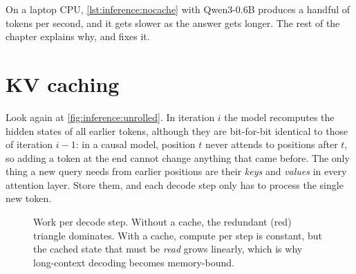 On a laptop CPU, \cref{lst:inference:nocache} with Qwen3-0.6B produces a handful of tokens per second,
and it gets slower as the answer gets longer. The rest of the chapter explains why, and fixes it.

\section{KV caching}\label{sec:inference:kvcache}

Look again at \cref{fig:inference:unrolled}. In iteration $i$ the model recomputes the hidden
states of all earlier tokens, although they are bit-for-bit identical to those of iteration $i-1$:
in a causal model, position $t$ never attends to positions after $t$, so adding a token at the end
cannot change anything that came before. The only thing a new query needs from earlier positions
are their \emph{keys} and \emph{values} in every attention layer. Store them, and each decode step
only has to process the single new token.

\begin{figure}[ht]
\centering
{}
\caption{Work per decode step. Without a cache, the redundant (red) triangle dominates.
With a cache, compute per step is constant, but the cached state that must be \emph{read} grows
linearly, which is why long-context decoding becomes memory-bound.}
\label{fig:inference:kvwork}
\end{figure}

